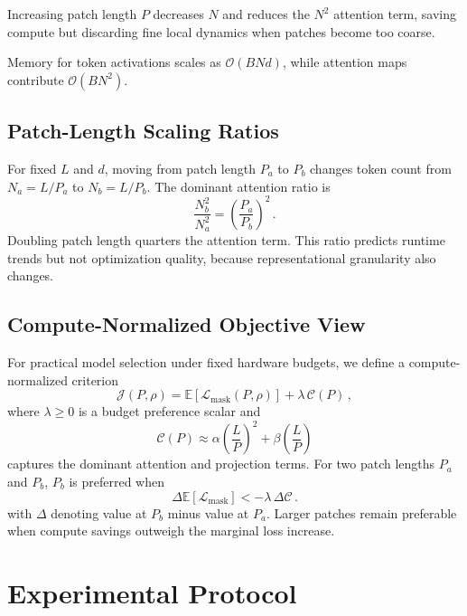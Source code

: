 \documentclass[journal]{IEEEtran}
\begin{document}
Increasing patch length $P$ decreases $N$ and reduces the $N^2$ attention term, saving compute but discarding fine local dynamics when patches become too coarse.

Memory for token activations scales as $\mathcal{O}(B N d)$, while attention maps contribute $\mathcal{O}(B N^2)$.

\subsection{Patch-Length Scaling Ratios}
For fixed $L$ and $d$, moving from patch length $P_a$ to $P_b$ changes token count from $N_a=L/P_a$ to $N_b=L/P_b$. The dominant attention ratio is
\begin{equation}
\frac{N_b^2}{N_a^2} = \left(\frac{P_a}{P_b}\right)^2\,.
\label{eq:ratio}
\end{equation}
Doubling patch length quarters the attention term. This ratio predicts runtime trends but not optimization quality, because representational granularity also changes.

\subsection{Compute-Normalized Objective View}
For practical model selection under fixed hardware budgets, we define a compute-normalized criterion
\begin{equation}
\mathcal{J}(P,\rho) = \mathbb{E}[\mathcal{L}_{\text{mask}}(P,\rho)] + \lambda\,\mathcal{C}(P)\,,
\label{eq:compute_obj}
\end{equation}
where $\lambda \ge 0$ is a budget preference scalar and
\begin{equation}
\mathcal{C}(P) \approx \alpha\left(\frac{L}{P}\right)^2 + \beta\left(\frac{L}{P}\right)
\label{eq:compute_cost}
\end{equation}
captures the dominant attention and projection terms. For two patch lengths $P_a$ and $P_b$, $P_b$ is preferred when
\begin{equation}
\Delta \mathbb{E}[\mathcal{L}_{\text{mask}}] < -\lambda\,\Delta\mathcal{C}\,.
\label{eq:tradeoff_rule}
\end{equation}
with $\Delta$ denoting value at $P_b$ minus value at $P_a$. Larger patches remain preferable when compute savings outweigh the marginal loss increase.

\section{Experimental Protocol}
\end{document}
